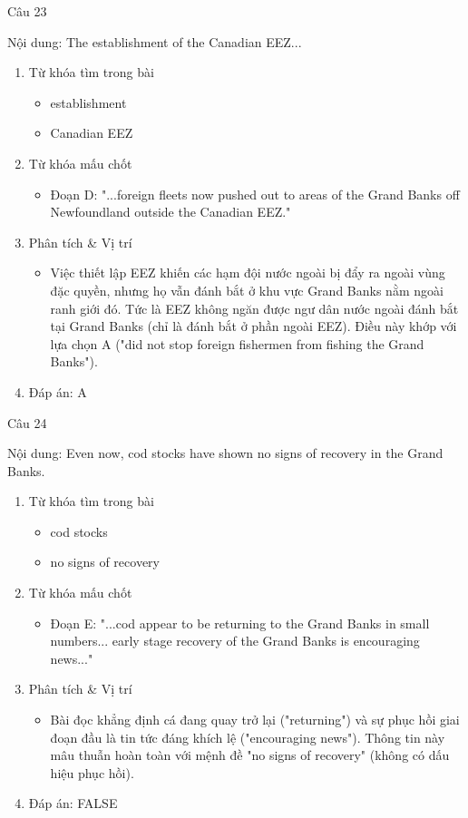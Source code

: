 \documentclass{../templateReading/cdreading}
\begin{document}
Câu 23

Nội dung: The establishment of the Canadian EEZ...
\begin{enumerate}
\item Từ khóa tìm trong bài
\begin{itemize}
\item establishment
\item Canadian EEZ
\end{itemize}
\item Từ khóa mấu chốt
\begin{itemize}
\item Đoạn D: "...foreign fleets now pushed out to areas of the Grand Banks off Newfoundland outside the Canadian EEZ."
\end{itemize}
\item Phân tích \& Vị trí
\begin{itemize}
\item Việc thiết lập EEZ khiến các hạm đội nước ngoài bị đẩy ra ngoài vùng đặc quyền, nhưng họ vẫn đánh bắt ở khu vực Grand Banks nằm ngoài ranh giới đó. Tức là EEZ không ngăn được ngư dân nước ngoài đánh bắt tại Grand Banks (chỉ là đánh bắt ở phần ngoài EEZ). Điều này khớp với lựa chọn A ("did not stop foreign fishermen from fishing the Grand Banks").
\end{itemize}
\item Đáp án: A
\end{enumerate}

Câu 24

Nội dung: Even now, cod stocks have shown no signs of recovery in the Grand Banks.
\begin{enumerate}
\item Từ khóa tìm trong bài
\begin{itemize}
\item cod stocks
\item no signs of recovery
\end{itemize}
\item Từ khóa mấu chốt
\begin{itemize}
\item Đoạn E: "...cod appear to be returning to the Grand Banks in small numbers... early stage recovery of the Grand Banks is encouraging news..."
\end{itemize}
\item Phân tích \& Vị trí
\begin{itemize}
\item Bài đọc khẳng định cá đang quay trở lại ("returning") và sự phục hồi giai đoạn đầu là tin tức đáng khích lệ ("encouraging news"). Thông tin này mâu thuẫn hoàn toàn với mệnh đề "no signs of recovery" (không có dấu hiệu phục hồi).
\end{itemize}
\item Đáp án: FALSE
\end{enumerate}
\end{document}
